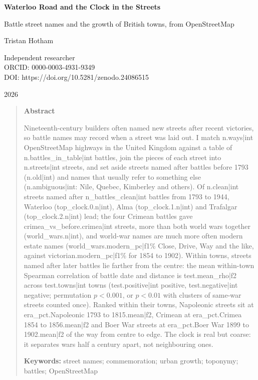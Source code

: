 \documentclass[11pt,a4paper]{article}
\begin{document}
\begin{center}
{\Large\bfseries Waterloo Road and the Clock in the Streets\par}
\vspace{0.4em}
{\large Battle street names and the growth of British towns, from OpenStreetMap\par}
\vspace{1.2em}
{\large Tristan Hotham\par}
\vspace{0.3em}
{\small Independent researcher\\
ORCID: 0000-0003-4931-9349\\
DOI: https://doi.org/10.5281/zenodo.24086515\par}
\vspace{0.8em}
2026
\end{center}

\begin{quote}
\small
\begin{center}\textbf{Abstract}\end{center}
Nineteenth-century builders often named new streets after recent victories, so battle names may record when a street was laid out. I match {{n.ways|int}} OpenStreetMap highways in the United Kingdom against a table of {{n.battles_in_table|int}} battles, join the pieces of each street into {{n.streets|int}} streets, and set aside streets named after battles before 1793 ({{n.old|int}}) and names that usually refer to something else ({{n.ambiguous|int}}: Nile, Quebec, Kimberley and others). Of {{n.clean|int}} streets named after {{n_battles_clean|int}} battles from 1793 to 1944, Waterloo ({{top_clock.0.n|int}}), Alma ({{top_clock.1.n|int}}) and Trafalgar ({{top_clock.2.n|int}}) lead; the four Crimean battles gave {{crimea_vs_before.crimea|int}} streets, more than both world wars together ({{world_wars.n|int}}), and world-war names are much more often modern estate names ({{world_wars.modern_pc|f1}}\% Close, Drive, Way and the like, against {{victorian.modern_pc|f1}}\% for 1854 to 1902). Within towns, streets named after later battles lie farther from the centre: the mean within-town Spearman correlation of battle date and distance is {{test.mean_rho|f2}} across {{test.towns|int}} towns ({{test.positive|int}} positive, {{test.negative|int}} negative; permutation $p<0.001$, or $p<0.01$ with clusters of same-war streets counted once). Ranked within their towns, Napoleonic streets sit at {{era_pct.Napoleonic 1793 to 1815.mean|f2}}, Crimean at {{era_pct.Crimea 1854 to 1856.mean|f2}} and Boer War streets at {{era_pct.Boer War 1899 to 1902.mean|f2}} of the way from centre to edge. The clock is real but coarse: it separates wars half a century apart, not neighbouring ones.

\textbf{Keywords:} street names; commemoration; urban growth; toponymy; battles; OpenStreetMap
\end{quote}
\end{document}
